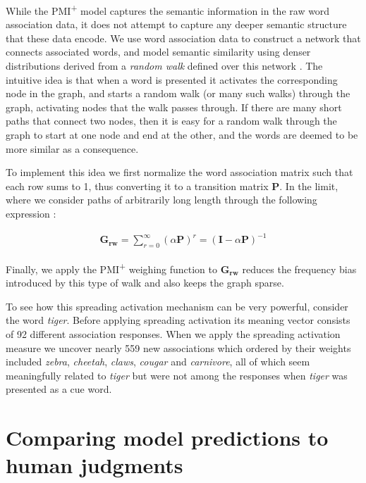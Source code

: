 \documentclass{article}
\begin{document}
While the PMI\textsuperscript{+} model captures the semantic information  in the raw word association data, it does not attempt to capture any deeper semantic structure that these data encode. We use word association data to construct a network that connects associated words, and model semantic similarity using denser distributions derived from a {\it random walk} defined over this network \cite{DeDeyne2016ACL}. The intuitive idea is that when a word is presented it activates the corresponding node in the graph, and starts a random walk (or many such walks) through the graph, activating nodes that the walk passes through. If there are many short paths that connect two nodes, then it is easy for a random walk through the graph to start at one node and end at the other, and the words are deemed to be more similar as a consequence.

To implement this idea we first normalize the word association matrix such that each row sums to 1, thus converting it to a transition matrix $\mathbf{P}$. In the limit, where we consider paths of arbitrarily long length through the following expression \cite{Newman2010}:

\begin{equation*}
\begin{array}{lcl}
\mathbf{G_{rw}}  = \sum_{r =0}^{\infty}(\alpha\mathbf{P})^r  =   (\mathbf{I} - \alpha \mathbf{P})^{-1}
\end{array}
\label{equation_RW_algebraic}
\end{equation*}

Finally, we apply the PMI\textsuperscript{+} weighing function to $\mathbf{G_{rw}}$ reduces the frequency bias introduced by this type of walk \cite{Newman2010} and also keeps the graph sparse.

To see how this spreading activation mechanism can be very powerful, consider the word \textit{tiger}. Before applying spreading activation its meaning vector consists of 92 different association responses. When we apply the spreading activation measure we uncover nearly 559 new associations which ordered by their weights included \textit{zebra}, \textit{cheetah}, \textit{claws}, \textit{cougar} and \textit{carnivore}, all of which seem meaningfully related to \textit{tiger} but were not among the responses when \textit{tiger} was presented as a cue word.


\section{Comparing model predictions to human judgments}
\label{sec:similarity}
\end{document}
